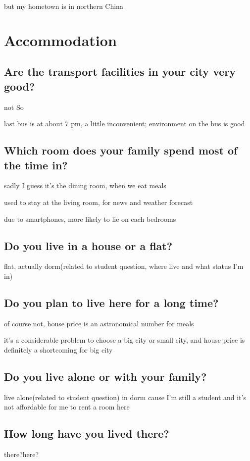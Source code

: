 \documentclass[conference]{IEEEtran}
\begin{document}
but my hometown is in northern China

\section{Accommodation}

\subsection{Are the transport facilities in your city very good?}
not So

last bus is at about 7 pm, a little inconvenient;
environment on the bus is good

\subsection{Which room does your family spend most of the time in?}
sadly I guess it's the dining room, when we eat meals

used to stay at the living room, for news and weather forecast

due to smartphones, more likely to lie on each bedrooms

\subsection{Do you live in a house or a flat?}
flat, actually dorm(related to student question, where live and what status
I'm in)

\subsection{Do you plan to live here for a long time?}
of course not, house price is an astronomical number for meals

it's a considerable problem to choose a big city or small city,
and house price is definitely a shortcoming for big city

\subsection{Do you live alone or with your family?}
live alone(related to student question) in dorm
cause I'm still a student and it's not affordable for me to rent a room here

\subsection{How long have you lived there?}
there?here?
\end{document}
